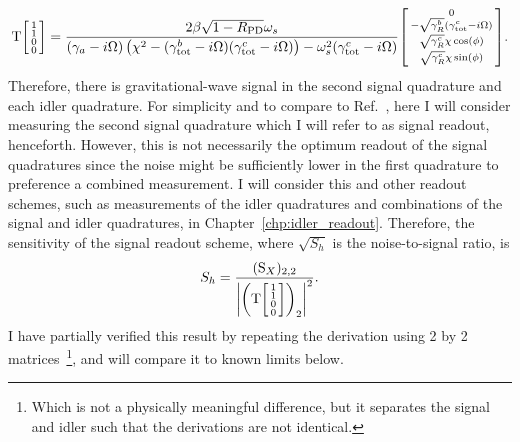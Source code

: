 \begin{equation}\label{eq:nIS_sigRO_signal_response}
\text{T}\begin{bsmallmatrix}1 \\1\\0\\0\end{bsmallmatrix} = \frac{2 \beta \sqrt{1-R_\text{PD}} \omega_s}{(\gamma_a-i \Omega ) \left(\chi ^2-(\gamma^b_\text{tot}-i\Omega) (\gamma^c_\text{tot}-i\Omega)\right)-\omega_s^2 (\gamma^c_\text{tot}-i \Omega )} \begin{bsmallmatrix}0 \\-\sqrt{\gamma^b_R}(\gamma^c_\text{tot}-i\Omega)\\\sqrt{\gamma^c_R}\chi\cos(\phi)\\\sqrt{\gamma^c_R}\chi\sin(\phi)\end{bsmallmatrix}.
\end{equation}
Therefore, there is gravitational-wave signal in the second signal quadrature and each idler quadrature. For simplicity and to compare to Ref.~\cite{Li2020}, here I will consider measuring the second signal quadrature which I will refer to as signal readout, henceforth. However, this is not necessarily the optimum readout of the signal quadratures since the noise might be sufficiently lower in the first quadrature to preference a combined measurement. I will consider this and other readout schemes, such as measurements of the idler quadratures and combinations of the signal and idler quadratures, in Chapter~\ref{chp:idler_readout}.
Therefore, the sensitivity of the signal readout scheme, where $\sqrt{S_h}$ is the noise-to-signal ratio, is
\begin{equation}\label{eq:nIS_sigRO_sens}
S_h = \frac{(\text{S}_X)_{2,2}}{\abs{\left(\text{T}\begin{bsmallmatrix}1 \\1\\0\\0\end{bsmallmatrix}\right)_2}^2}.
\end{equation}
 I have partially verified this result by repeating the derivation using 2 by 2 matrices~\footnote{Which is not a physically meaningful difference, but it separates the signal and idler such that the derivations are not identical.}, and will compare it to known limits below. %


